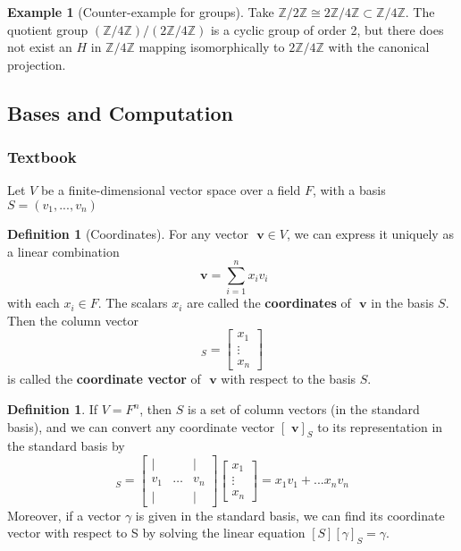 \documentclass[12pt]{article}
\theoremstyle{definition}
\newtheorem{defn}[thm]{Definition}
\newtheorem{eg}[thm]{Example}
\theoremstyle{remark}
\numberwithin{equation}{section}
\newcommand\Z{\mathbb Z}    %
\newcommand\B[1]{\textbf{ #1}}
\begin{document}
\vspace{15pt}

\begin{eg}[Counter-example for groups]
        Take $\Z/2\Z \cong 2\Z/4\Z \subset \Z/4\Z$. The quotient group $(\Z/4\Z)/(2\Z/4\Z)$ is a cyclic group of order 2, but there does not exist an $H$ in $\Z/4\Z$ mapping isomorphically to $2\Z/4\Z$ with the canonical projection.
\end{eg}


\subsection{Bases and Computation}

\subsubsection{Textbook}

Let $V$ be a finite-dimensional vector space over a field $F$, with a basis $S = (v_1,...,v_n)$

\begin{defn}[Coordinates]
        For any vector $\B{v} \in V$, we can express it uniquely as a linear combination \begin{equation}
                \B{v} = \sum\limits_{i=1}^nx_iv_i
        \end{equation}
        with each $x_i \in F$. The scalars $x_i$ are called the \B{coordinates} of $\B{v}$ in the basis $S$. Then the column vector \begin{equation}
                [\B{v}]_S = \begin{bmatrix} x_1 \\ \vdots \\ x_n \end{bmatrix}
        \end{equation}
        is called the \B{coordinate vector} of $\B{v}$ with respect to the basis $S$.
\end{defn}

\vspace{15pt}

\begin{defn}
        If $V = F^n$, then $S$ is a set of column vectors (in the standard basis), and we can convert any coordinate vector $[\B{v}]_S$ to its representation in the standard basis by \begin{equation}
                [S][\B{v}]_S = \begin{bmatrix} \vert & & \vert \\ v_1 & \hdots & v_n \\ \vert & & \vert \end{bmatrix}\begin{bmatrix} x_1 \\ \vdots \\ x_n \end{bmatrix} = x_1v_1+...x_nv_n
        \end{equation}
        Moreover, if a vector $\gamma$ is given in the standard basis, we can find its coordinate vector with respect to S by solving the linear equation $[S][\gamma]_S = \gamma$.
\end{defn}
\end{document}
